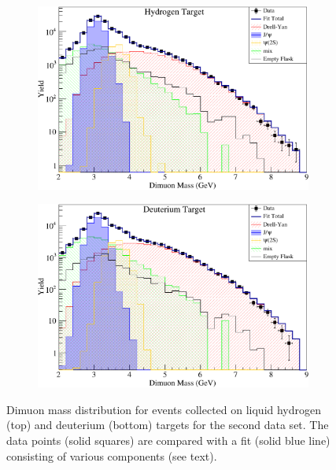 \documentclass[reprint,aps,unsortedaddress,superscriptaddress,prc,floatfix,showpacs,linenumbers,final]{revtex4-2}
\begin{document}
\begin{figure}[htbp!]
	\centering
	\begin{subfigure}{\linewidth}
		\includegraphics[width=\linewidth]{massfit_run56_LH2.pdf}
	\end{subfigure}
	\begin{subfigure}{\linewidth}
		\includegraphics[width=\linewidth]{massfit_run56_LD2.pdf}
	\end{subfigure}
	\caption{Dimuon mass distribution for events collected
		on liquid hydrogen (top) and deuterium (bottom) targets for the second data set.
		The data points (solid squares) are compared with a fit (solid blue line) consisting of
		various components (see text).}
	\label{fig:massfit}
\end{figure}
\end{document}
